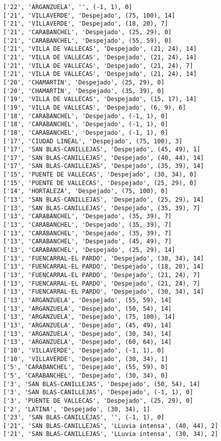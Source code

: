 \documentclass[11pt]{article}
\begin{document}
\begin{Verbatim}[commandchars=\\\{\}]
['22', 'ARGANZUELA', '', (-1, 1), 0]
['21', 'VILLAVERDE', 'Despejado', (75, 100), 14]
['21', 'VILLAVERDE', 'Despejado', (18, 20), 7]
['21', 'CARABANCHEL', 'Despejado', (25, 29), 0]
['21', 'CARABANCHEL', 'Despejado', (55, 59), 0]
['21', 'VILLA DE VALLECAS', 'Despejado', (21, 24), 14]
['21', 'VILLA DE VALLECAS', 'Despejado', (21, 24), 14]
['21', 'VILLA DE VALLECAS', 'Despejado', (21, 24), 7]
['21', 'VILLA DE VALLECAS', 'Despejado', (21, 24), 14]
['20', 'CHAMARTÍN', 'Despejado', (25, 29), 0]
['20', 'CHAMARTÍN', 'Despejado', (35, 39), 0]
['19', 'VILLA DE VALLECAS', 'Despejado', (15, 17), 14]
['19', 'VILLA DE VALLECAS', 'Despejado', (6, 9), 6]
['18', 'CARABANCHEL', 'Despejado', (-1, 1), 0]
['18', 'CARABANCHEL', 'Despejado', (-1, 1), 0]
['18', 'CARABANCHEL', 'Despejado', (-1, 1), 0]
['17', 'CIUDAD LINEAL', 'Despejado', (75, 100), 3]
['17', 'SAN BLAS-CANILLEJAS', 'Despejado', (45, 49), 1]
['17', 'SAN BLAS-CANILLEJAS', 'Despejado', (40, 44), 14]
['17', 'SAN BLAS-CANILLEJAS', 'Despejado', (35, 39), 14]
['15', 'PUENTE DE VALLECAS', 'Despejado', (30, 34), 0]
['15', 'PUENTE DE VALLECAS', 'Despejado', (25, 29), 0]
['14', 'HORTALEZA', 'Despejado', (75, 100), 0]
['13', 'SAN BLAS-CANILLEJAS', 'Despejado', (25, 29), 14]
['13', 'SAN BLAS-CANILLEJAS', 'Despejado', (35, 39), 7]
['13', 'CARABANCHEL', 'Despejado', (35, 39), 7]
['13', 'CARABANCHEL', 'Despejado', (35, 39), 7]
['13', 'CARABANCHEL', 'Despejado', (35, 39), 7]
['13', 'CARABANCHEL', 'Despejado', (45, 49), 7]
['13', 'CARABANCHEL', 'Despejado', (25, 29), 14]
['13', 'FUENCARRAL-EL PARDO', 'Despejado', (30, 34), 14]
['13', 'FUENCARRAL-EL PARDO', 'Despejado', (18, 20), 14]
['13', 'FUENCARRAL-EL PARDO', 'Despejado', (21, 24), 7]
['13', 'FUENCARRAL-EL PARDO', 'Despejado', (21, 24), 7]
['13', 'FUENCARRAL-EL PARDO', 'Despejado', (30, 34), 14]
['13', 'ARGANZUELA', 'Despejado', (55, 59), 14]
['13', 'ARGANZUELA', 'Despejado', (50, 54), 14]
['13', 'ARGANZUELA', 'Despejado', (75, 100), 14]
['13', 'ARGANZUELA', 'Despejado', (45, 49), 14]
['13', 'ARGANZUELA', 'Despejado', (30, 34), 14]
['13', 'ARGANZUELA', 'Despejado', (60, 64), 14]
['10', 'VILLAVERDE', 'Despejado', (-1, 1), 0]
['10', 'VILLAVERDE', 'Despejado', (30, 34), 1]
['5', 'CARABANCHEL', 'Despejado', (55, 59), 0]
['5', 'CARABANCHEL', 'Despejado', (30, 34), 0]
['3', 'SAN BLAS-CANILLEJAS', 'Despejado', (50, 54), 14]
['3', 'SAN BLAS-CANILLEJAS', 'Despejado', (-1, 1), 0]
['3', 'PUENTE DE VALLECAS', 'Despejado', (25, 29), 0]
['2', 'LATINA', 'Despejado', (30, 34), 1]
['23', 'SAN BLAS-CANILLEJAS', '', (-1, 1), 0]
['21', 'SAN BLAS-CANILLEJAS', 'LLuvia intensa', (40, 44), 2]
['21', 'SAN BLAS-CANILLEJAS', 'LLuvia intensa', (30, 34), 2]

\end{Verbatim}
\end{document}
